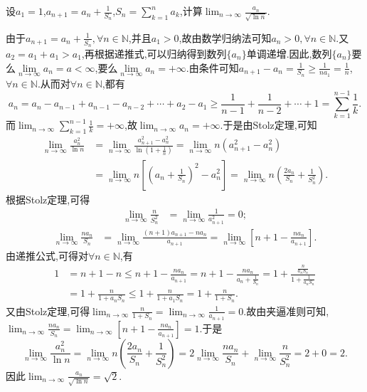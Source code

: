 \documentclass[../../main.tex]{subfiles}
\begin{document}
\begin{example}
设\(a_1 = 1\),\(a_{n + 1} = a_n + \frac{1}{S_n}\),\(S_n = \sum\limits_{k = 1}^{n} a_k\),计算\(\lim_{n \to \infty} \frac{a_n}{\sqrt{\ln n}}\).
\end{example}
\begin{solution}
由于$a_{n + 1} = a_n + \frac{1}{S_n},\forall n\in \mathbb{N}$,并且$a_1>0$,故由数学归纳法可知$a_n>0,\forall n\in \mathbb{N}$.又$a_2=a_1+a_1>a_1$,再根据递推式,可以归纳得到数列$\{a_n\}$单调递增.因此,数列$\{a_n\}$要么$\underset{n\rightarrow \infty}{\lim}a_n=a<\infty $,要么$\underset{n\rightarrow \infty}{\lim}a_n=+\infty $.由条件可知\(a_{n + 1}-a_n=\frac{1}{S_n}\geqslant\frac{1}{na_1}=\frac{1}{n}\),\(\forall n\in\mathbb{N}\).从而对\(\forall n\in\mathbb{N}\),都有
\[
a_n=a_n - a_{n - 1}+a_{n - 1}-a_{n - 2}+\cdots+a_2 - a_1\geqslant\frac{1}{n - 1}+\frac{1}{n - 2}+\cdots+1=\sum_{k = 1}^{n - 1}\frac{1}{k}.
\]
而\(\lim_{n\rightarrow\infty}\sum_{k = 1}^{n - 1}\frac{1}{k}=+\infty\),故\(\lim_{n\rightarrow\infty}a_n=+\infty\).于是由Stolz定理,可知
\begin{align*}
\lim_{n\rightarrow\infty}\frac{a_n^2}{\ln n}&=\lim_{n\rightarrow\infty}\frac{a_{n + 1}^2 - a_n^2}{\ln(1+\frac{1}{n})}=\lim_{n\rightarrow\infty}n(a_{n + 1}^2 - a_n^2)\\
&=\lim_{n\rightarrow\infty}n\left[\left(a_n+\frac{1}{S_n}\right)^2 - a_n^2\right]=\lim_{n\rightarrow\infty}n\left(\frac{2a_n}{S_n}+\frac{1}{S_n^2}\right).
\end{align*}
根据Stolz定理,可得
\begin{align*}
\lim_{n\rightarrow\infty}\frac{n}{S_n^2}&=\lim_{n\rightarrow\infty}\frac{1}{a_{n + 1}^2}=0;
\end{align*}
\begin{align*}
\lim_{n\rightarrow\infty}\frac{na_n}{S_n}&=\lim_{n\rightarrow\infty}\frac{(n + 1)a_{n + 1}-na_n}{a_{n + 1}}=\lim_{n\rightarrow\infty}\left[n + 1-\frac{na_n}{a_{n + 1}}\right].
\end{align*}
由递推公式,可得对\(\forall n\in\mathbb{N}\),有
\begin{align*}
1&=n + 1 - n\leqslant n + 1-\frac{na_n}{a_{n + 1}}=n + 1-\frac{na_n}{a_n+\frac{1}{S_n}}=1+\frac{\frac{n}{a_nS_n}}{1+\frac{1}{a_nS_n}}\\
&=1+\frac{n}{1 + a_nS_n}\leqslant1+\frac{n}{1 + a_1S_n}=1+\frac{n}{1 + S_n}.
\end{align*}
又由Stolz定理,可得\(\lim_{n\rightarrow\infty}\frac{n}{1 + S_n}=\lim_{n\rightarrow\infty}\frac{1}{a_{n + 1}}=0\).故由夹逼准则可知,\(\lim_{n\rightarrow\infty}\frac{na_n}{S_n}=\lim_{n\rightarrow\infty}\left[n + 1-\frac{na_n}{a_{n + 1}}\right]=1\).于是
\[
\lim_{n\rightarrow\infty}\frac{a_n^2}{\ln n}=\lim_{n\rightarrow\infty}n\left(\frac{2a_n}{S_n}+\frac{1}{S_n^2}\right)=2\lim_{n\rightarrow\infty}\frac{na_n}{S_n}+\lim_{n\rightarrow\infty}\frac{n}{S_n^2}=2 + 0=2.
\]
因此\(\lim_{n\rightarrow\infty}\frac{a_n}{\sqrt{\ln n}}=\sqrt{2}\).

\end{solution}
\end{document}
